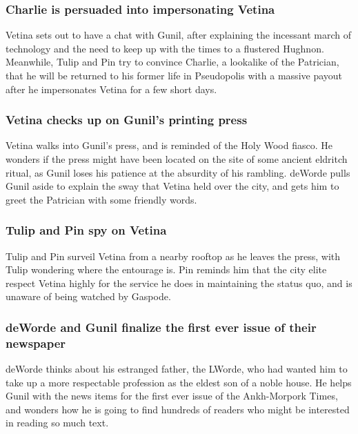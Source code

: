 \subsubsection{\Gls{Charlie} is persuaded into impersonating \Gls{Vetina}}
\Gls{Vetina} sets out to have a chat with \Gls{Gunil}, after explaining the incessant march of
technology and the need to keep up with the times to a flustered \Gls{Hughnon}. Meanwhile,
\Gls{Tulip} and \Gls{Pin} try to convince \Gls{Charlie}, a lookalike of the Patrician, that he will
be returned to his former life in Pseudopolis with a massive payout after he impersonates
\Gls{Vetina} for a few short days.

\subsubsection{\Gls{Vetina} checks up on \Gls{Gunil}'s printing press}
\Gls{Vetina} walks into \Gls{Gunil}'s press, and is reminded of the Holy Wood fiasco. He wonders if
the press might have been located on the site of some ancient eldritch ritual, as \Gls{Gunil}
loses his patience at the absurdity of his rambling. \Gls{deWorde} pulls \Gls{Gunil} aside to
explain the sway that \Gls{Vetina} held over the city, and gets him to greet the Patrician with
some friendly words.

\subsubsection{\Gls{Tulip} and \Gls{Pin} spy on \Gls{Vetina}}
\Gls{Tulip} and \Gls{Pin} surveil \Gls{Vetina} from a nearby rooftop as he leaves the press, with
\Gls{Tulip} wondering where the entourage is. \Gls{Pin} reminds him that the city elite respect
\Gls{Vetina} highly for the service he does in maintaining the status quo, and is unaware of being
watched by \Gls{Gaspode}.

\subsubsection{\Gls{deWorde} and \Gls{Gunil} finalize the first ever issue of their newspaper}
\Gls{deWorde} thinks about his estranged father, the \Gls{LWorde}, who had wanted him to take
up a more respectable profession as the eldest son of a noble house. He helps \Gls{Gunil} with the
news items for the first ever issue of the Ankh-Morpork Times, and wonders how he is going to find
hundreds of readers who might be interested in reading so much text.

